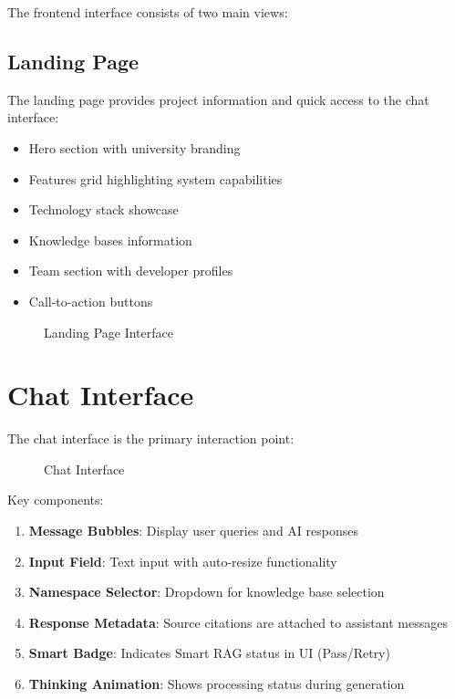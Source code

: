 \documentclass[12pt,a4paper]{book}
\numberwithin{table}{chapter}
\numberwithin{figure}{chapter}
\numberwithin{equation}{chapter}
\begin{document}
The frontend interface consists of two main views:

\subsection{Landing Page}
The landing page provides project information and quick access to the chat interface:
\begin{itemize}
    \item Hero section with university branding
    \item Features grid highlighting system capabilities
    \item Technology stack showcase
    \item Knowledge bases information
    \item Team section with developer profiles
    \item Call-to-action buttons
\end{itemize}

\begin{figure}[h]
\caption{Landing Page Interface}
\label{fig:landing}
\end{figure}

\section{Chat Interface}

The chat interface is the primary interaction point:

\begin{figure}[h]
\caption{Chat Interface}
\label{fig:chat}
\end{figure}

Key components:
\begin{enumerate}
    \item \textbf{Message Bubbles}: Display user queries and AI responses
    \item \textbf{Input Field}: Text input with auto-resize functionality
    \item \textbf{Namespace Selector}: Dropdown for knowledge base selection
    \item \textbf{Response Metadata}: Source citations are attached to assistant messages
    \item \textbf{Smart Badge}: Indicates Smart RAG status in UI (Pass/Retry)
    \item \textbf{Thinking Animation}: Shows processing status during generation
\end{enumerate}
\end{document}
